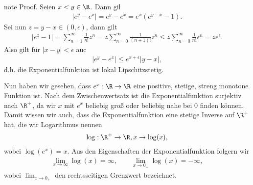 \documentclass[letterpaper,10pt,english]{jupyterBook}
\begin{document}
\begin{sphinxadmonition}{note}
Proof.  Seien \(x  < y \in \R\). Dann gil
\begin{equation*}
\begin{split} \left\vert e^y - e^x \right\vert = e^y - e^x = e^x ( e^{y-x} - 1).\end{split}
\end{equation*}
Sei nun \(z=y-x \in (0,\epsilon)\), dann gilt
\begin{equation*}
\begin{split}  \left\vert e^z -  1 \right\vert = \sum_{n=1}^\infty \frac{1}{n!} z^n = z \sum_{n=0}^\infty \frac{1}{(n+1)!} z^n  \leq z \sum_{n=0}^\infty \frac{1}{n!} \epsilon^n = z e^\epsilon.\end{split}
\end{equation*}
Also gilt für \(|x-y| < \epsilon\) auc
\begin{equation*}
\begin{split}  \left\vert e^y - e^x \right\vert \leq e^{x+\epsilon} |y-x|,\end{split}
\end{equation*}
d.h. die Exponentialfunktion ist lokal Lipschitz\sphinxhyphen{}stetig.
\end{sphinxadmonition}

Nun haben wir gesehen, dass \(e^x: \R \rightarrow \R\) eine positive, stetige, streng monotone Funktion ist. Nach dem Zwischenwertsatz ist die Exponentialfunktion surjektiv nach \(\R^+\), da wir \(x\) mit \(e^x\) beliebig groß oder beliebig nahe bei \(0\) finden können. Damit wissen wir auch, dass die Exponentialfunktion eine stetige Inverse auf \(\R^+\) hat, die wir Logarithmus nennen
\begin{equation*}
\begin{split} \log: \R^+ \rightarrow \R, x \rightarrow \log(x),\end{split}
\end{equation*}
wobei \(\log(e^x) =x\). Aus den Eigenschaften der Exponentialfunktion folgern wir
\begin{equation*}
\begin{split} \lim_{x\rightarrow \infty} \log(x) = \infty, \qquad \lim_{x\rightarrow 0_+} \log(x) = -\infty,\end{split}
\end{equation*}
wobei \(\lim_{x\rightarrow 0_+}\) den rechtsseitigen Grenzwert bezeichnet.
\end{document}

